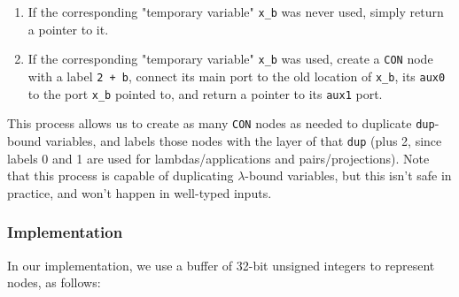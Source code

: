 \documentclass{article}
\theoremstyle{definition}
\theoremstyle{theorem}
\begin{document}
\begin{enumerate}
  \item If the corresponding "temporary variable" \verb|x_b| was never used,
  simply return a pointer to it.

  \item If the corresponding "temporary variable" \verb|x_b| was used, create a
  \verb|CON| node with a label \verb|2 + b|, connect its main port to the old
  location of \verb|x_b|, its \verb|aux0| to the port \verb|x_b| pointed to, and
  return a pointer to its \verb|aux1| port.
\end{enumerate}

This process allows us to create as many \verb|CON| nodes as needed to duplicate
\verb|dup|-bound variables, and labels those nodes with the layer of that
\verb|dup| (plus 2, since labels 0 and 1 are used for lambdas/applications and
pairs/projections). Note that this process is capable of duplicating
$\lambda$-bound variables, but this isn't safe in practice, and won't happen in
well-typed inputs.

\subsubsection{Implementation}

In our implementation, we use a buffer of 32-bit unsigned integers to represent
nodes, as follows:
\end{document}
